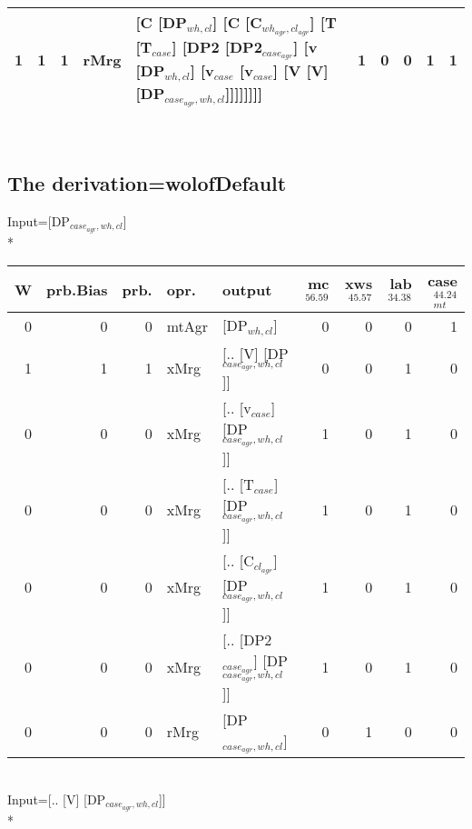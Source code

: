 \begin{tabularx}{\linewidth}{rrrlXrrrrr}
   1 &       1 &   1 & rMrg & [C [DP$_{wh,cl}$] [C [C$_{wh_{agr},cl_{agr}}$] [T [T$_{case}$] [DP2 [DP2$_{case_{agr}}$] [v [DP$_{wh,cl}$] [v$_{case}$ [v$_{case}$] [V [V] [DP$_{case_{agr},wh,cl}$]]]]]]]]                                                                                                     &             1 &             0 &                  0 &           1 &           1 \\
\hline
\end{tabularx}\endgroup\\
\subsection{The derivation=wolofDefault}
\begingroup\scriptsize Input=[DP$_{case_{agr},wh,cl}$]\\*
\begin{tabularx}{\linewidth}{rrrlXrrrr}
\hline
   W &   prb.Bias &   prb. & opr.    & output                                  &   mc$^{56.59}$ &   xws$^{45.57}$ &   lab$^{34.38}$ &   case$_{mt}^{44.24}$ \\
\hline
   0 &       0 &   0 & mtAgr & [DP$_{wh,cl}$]                              &            0 &             0 &             0 &                 1 \\
   1 &       1 &   1 & xMrg  & [.. [V] [DP$_{case_{agr},wh,cl}$]]            &            0 &             0 &             1 &                 0 \\
   0 &       0 &   0 & xMrg  & [.. [v$_{case}$] [DP$_{case_{agr},wh,cl}$]]       &            1 &             0 &             1 &                 0 \\
   0 &       0 &   0 & xMrg  & [.. [T$_{case}$] [DP$_{case_{agr},wh,cl}$]]       &            1 &             0 &             1 &                 0 \\
   0 &       0 &   0 & xMrg  & [.. [C$_{cl_{agr}}$] [DP$_{case_{agr},wh,cl}$]]     &            1 &             0 &             1 &                 0 \\
   0 &       0 &   0 & xMrg  & [.. [DP2$_{case_{agr}}$] [DP$_{case_{agr},wh,cl}$]] &            1 &             0 &             1 &                 0 \\
   0 &       0 &   0 & rMrg  & [DP$_{case_{agr},wh,cl}$]                     &            0 &             1 &             0 &                 0 \\
\hline
\end{tabularx}\endgroup\\
\begingroup\scriptsize Input=[.. [V] [DP$_{case_{agr},wh,cl}$]]\\*
